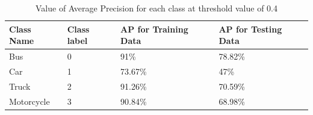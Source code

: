\begin{table}[H]
	\caption{Value of Average Precision for each class at threshold value of 0.4}
	\label{table:5.1}
	  \begin{center}
		\scalebox{1.1}
		{\begin{tabular}{|l |l |l |l |}
	    \hline
	    Class Name  & Class label  & AP for Training Data & AP for Testing Data
		\\ \hline
		Bus &  0 & 91\% & 78.82\%
		\\ \hline
		Car & 1 & 73.67\% & 47\%
		\\ \hline  
		Truck & 2 & 91.26\% & 70.59\%
		\\ \hline  
	    Motorcycle & 3 & 90.84\% & 68.98\%
	    \\ \hline 
		\end{tabular}}
	  \end{center}
\end{table}

